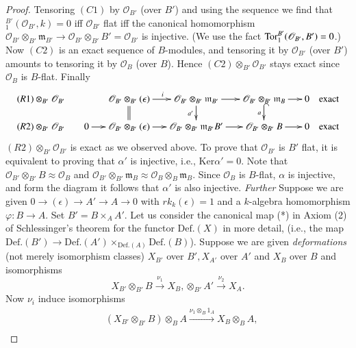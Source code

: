 {\begin{proof}
Tensoring $(C1)$ by $\mathscr{O}_{B'}$ (over $B'$) and using
the  sequence we find
that $^{B'}_{1}(\mathscr{O}_{B'}, k)=0$ iff
$\mathscr{O}_{B'}$ flat iff the canonical homomorphism
$\mathscr{O}_{B'} \otimes_{B'} \mathfrak{m}_{B'}\to \mathscr{O}_{B'}\otimes_{B'}
B'=\mathscr{O}_{B'}$ is injective. (We use the fact
$\text{Tor}_{1}^{B'}\break(\mathscr{O}_{B'}, B')=0$.) Now $(C2)$ is an exact
sequence of $B$-modules, and tensoring it by $\mathscr{O}_{B'}$ (over
$B'$) amounts to tensoring it by $\mathscr{O}_{B}$ (over $B$). Hence
$(C2)\otimes_{B'}\mathscr{O}_{B'}$ stays exact since $\mathscr{O}_{B}$
is $B$-flat. Finally 
{\fontsize{8}{10}\selectfont
\begin{equation*}
\xymatrix@=.5cm{
(R1)\otimes_{B'}\mathscr{O}_{B'} &
&  \mathscr{O}_{B'}\otimes_{B'}\ar@{=} [d] (\epsilon)\ar
[r]^{i}& \mathscr{O}_{B'}\otimes_{B'}\ar [d]_{a'}\mathfrak{m}_{B'}\ar
[r]
&\mathscr{O}_{B'}\otimes_{B'}\ar@{^{(}->}[d]_{a} \mathfrak{m}_{B}\ar
[r]&0\quad\text{exact}\\ 
(R2)\otimes_{B'}\mathscr{O}_{B'}& 0 \ar [r]
& \mathscr{O}_{B'} \otimes_{B'}
(\epsilon)\ar[r]&\mathscr{O}_{B'}\otimes_{B'}\mathfrak{m}_{B'}B'\ar
[r]& \mathscr{O}_{B'}\otimes_{B'} B\ar [r]&0\quad\text{exact} 
} 
\end{equation*}}
$(R2) \otimes_{B'}\mathscr{O}_{B'}$ is exact as we observed above. To
prove that $\mathscr{O}_{B'}$ is $B'$ flat, it is equivalent to
proving that $\alpha'$ is injective, i.e., $\text{Ker}\alpha'=0$. Note
that $\mathscr{O}_{B'}\otimes_{B'} B\approx \mathscr{O}_{B}$ and
$\mathscr{O}_{B'} \otimes_{B'} \mathfrak{m}_{B}\approx \mathscr{O}_{B} \otimes_{B} \mathfrak{m}_{B}$. Since
$\mathscr{O}_{B}$ is $B$-flat, $\alpha$ is injective, and form the
diagram it follows that $\alpha'$ is also injective. {\em
Further}
Suppose we are given $0\to (\epsilon)\to A'\to A\to 0$ with
$rk_k(\epsilon)=1$ and a $k$-algebra homomorphism $\varphi:B\to
A$. Set $B'=B\times_A A'$. Let us consider the canonical map (*) in
Axiom (2) of Schlessinger's theorem for the functor $\text{Def}.(X)$
in more detail, (i.e., the map
$\text{Def}.(B')\to \text{Def}.(A')\times_{\text{Def}.(A)}\text{Def}.(B)$). Suppose
we are given {\em deformations} (not merely isomorphism classes)
$X_{B'}$ over $B', X_{A'}$ over $A'$ and $X_{B}$ over $B$ and
isomorphisms 
$$
X_{B'}\otimes_{B'}B\xrightarrow{\nu_{1}}X_B, \otimes_{B'}A'\xrightarrow{\nu_{2}}X_A.
$$
Now $\nu_i$ induce isomorphisms
\begin{align*}
& (X_{B'}\otimes_{B'} B)\otimes_{B} A\xrightarrow{\nu_1\otimes_B 1_A}X_B\otimes_B A,\\

\end{align*}
\end{proof}}
